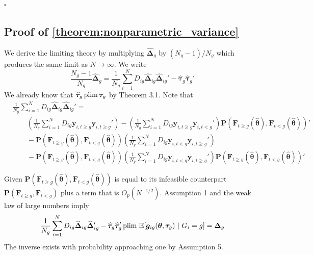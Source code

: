 \documentclass[12pt]{article}
\begin{document}
$\square$




\subsection*{Proof of \autoref{theorem:nonparametric_variance}}

We derive the limiting theory by multiplying $\widehat{\bm \Delta}_g$ by $(N_g-1)/N_g$ which produces the same limit as $N \rightarrow \infty$. We write
\begin{equation*}
    \frac{N_g - 1}{ N_g} \widehat{\bm \Delta}_g = \frac{1}{N_g} \sum_{i = 1}^N D_{ig} \widehat{\bm \Delta}_{ig} \widehat{\bm \Delta}_{ig}' - \widehat{\bm \tau}_g \widehat{\bm \tau}_g'
\end{equation*}
We already know that $\widehat{\bm \tau}_g \operatorname{plim} \bm \tau_g$ by Theorem 3.1. Note that 
\begin{align*}
  &\frac{1}{N_g} \sum_{i = 1}^N D_{ig} \widehat{\bm \Delta}_{ig} \widehat{\bm \Delta}_{ig}' =\\
  &\qquad \left( \frac{1}{N_g} \sum_{i = 1}^N D_{ig}  \bm y_{i, t \geq g} \bm y_{i, t \geq g}' \right) - \left( \frac{1}{N_g} \sum_{i = 1}^N D_{ig} \bm y_{i, t \geq g} \bm y_{i, t < g}' \right) \bm P(\bm{F}_{t \geq g}(\widehat{\bm{\theta}}), \bm{F}_{t < g}(\widehat{\bm{\theta}}))' \\
  &\qquad- \bm P(\bm{F}_{t \geq g}(\widehat{\bm{\theta}}), \bm{F}_{t < g}(\widehat{\bm{\theta}})) \left( \frac{1}{N_g} \sum_{i = 1}^N D_{ig} \bm y_{i, t < g} \bm y_{i, t \geq g}' \right)\\
  &\qquad- \bm P(\bm{F}_{t \geq g}(\widehat{\bm{\theta}}), \bm{F}_{t < g}(\widehat{\bm{\theta}})) \left( \frac{1}{N_g} \sum_{i = 1}^N D_{ig}  \bm y_{i, t < g} \bm y_{i, t \geq g}' \right) \bm P(\bm{F}_{t \geq g}(\widehat{\bm{\theta}}), \bm{F}_{t < g}(\widehat{\bm{\theta}}))'
\end{align*} 

Given $\bm P(\bm{F}_{t \geq g}(\widehat{\bm{\theta}}), \bm{F}_{t < g}(\widehat{\bm{\theta}}))$ is equal to its infeasible counterpart $\bm P(\bm{F}_{t \geq g}, \bm{F}_{t < g})$ plus a term that is $O_p(N^{-1/2})$. Assumption 1 and the weak law of large numbers imply 
\begin{equation*}
    \frac{1}{N_g} \sum_{i = 1}^N D_{ig} \widehat{\bm \Delta}_{ig} \widehat{\bm \Delta}_{ig}' - \widehat{\bm \tau}_g \widehat{\bm \tau}_g' \plim \expec{\bm g_{ig}(\bm{\theta}, \bm \tau_g)}{G_i = g} = \bm \Delta_g
\end{equation*}
The inverse exists with probability approaching one by Assumption 5.
\end{document}
